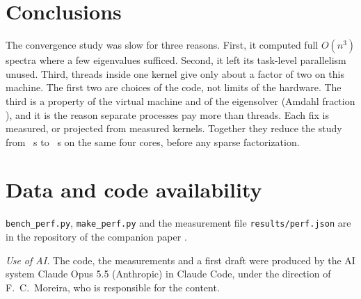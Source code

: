 \documentclass[pre,twocolumn,superscriptaddress,longbibliography]{revtex4-2}
\newif\ifaiauthor
\newif\ifshowtodos
\newcommand{\todo}[1]{\ifshowtodos\textcolor{red}{[TODO: #1]}\fi}
\begin{document}
\section{Conclusions}
The convergence study was slow for three reasons. First, it computed full $O(n^3)$ spectra where a
few eigenvalues sufficed. Second, it left its task-level parallelism unused. Third, threads inside
one kernel give only about a factor of two on this machine. The first two are choices of the code,
not limits of the hardware. The third is a property of the virtual machine and of the eigensolver
(Amdahl fraction \pAmEig), and it is the reason separate processes pay more than threads. Each fix
is measured, or projected from measured kernels. Together they reduce the study from \tProjRun~s
to \tProjArn~s on the same four cores, before any sparse factorization.

\section*{Data and code availability}
\texttt{bench\_perf.py}, \texttt{make\_perf.py} and the measurement file \texttt{results/perf.json}
are in the repository of the companion paper \cite{Paper1}.

\begin{acknowledgments}
\todo{acknowledgments.}
\ifaiauthor\else
\emph{Use of AI.} The code, the measurements and a first draft were produced by the AI system Claude
Opus 5.5 (Anthropic) in Claude Code, under the direction of F.~C.~Moreira, who is responsible for
the content.
\fi
\end{acknowledgments}


\end{document}
